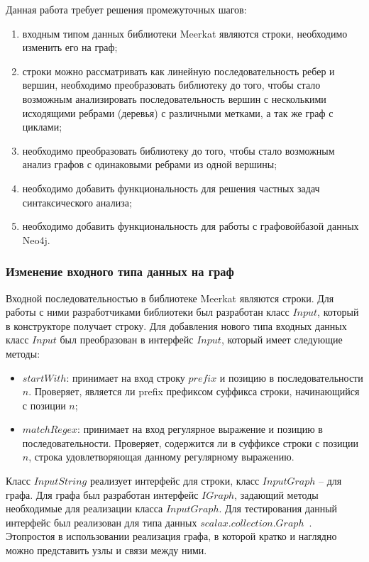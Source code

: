 Данная работа требует решения промежуточных шагов:
\begin{enumerate}
\item входным типом данных библиотеки Meerkat являются строки, необходимо изменить его на граф;
\item строки можно рассматривать как линейную последовательность ребер и вершин, необходимо преобразовать библиотеку до того, чтобы стало возможным анализировать последовательность вершин с несколькими исходящими ребрами (деревья) с различными метками, а так же граф с циклами;
\item необходимо преобразовать библиотеку до того, чтобы стало возможным анализ графов с одинаковыми ребрами из одной вершины;
\item необходимо добавить функциональность для решения частных задач синтаксического анализа;
\item необходимо добавить функциональность для работы с графовойбазой данных Neo4j.
\end{enumerate}

\subsubsection{Изменение входного типа данных на граф}


Входной последовательностью в библиотеке Meerkat являются строки. Для работы с ними разработчиками библиотеки был разработан класс $Input$, который в конструкторе получает строку. Для добавления нового типа входных данных класс $Input$ был преобразован в интерфейс $Input$, который имеет следующие методы:
\begin{itemize}
\item $startWith$: принимает на вход строку $prefix$ и позицию в последовательности $n$. Проверяет, является ли prefix префиксом суффикса строки, начинающийся с позиции $n$;
\item $matchRegex$: принимает на вход регулярное выражение и позицию в последовательности. Проверяет, содержится ли в суффиксе строки с позиции $n$, строка удовлетворяющая данному регулярному выражению.
\end{itemize}

Класс $InputString$ реализует интерфейс для строки, класс $InputGraph$ – для графа. Для графа был разработан интерфейс $IGraph$, задающий методы необходимые для реализации класса $InputGraph$. Для тестирования данный интерфейс был реализован для типа данных $scalax.collection.Graph$~\cite{Graph}. Этопростоя в использовании реализация графа, в которой кратко и наглядно можно представить узлы и связи между ними.

